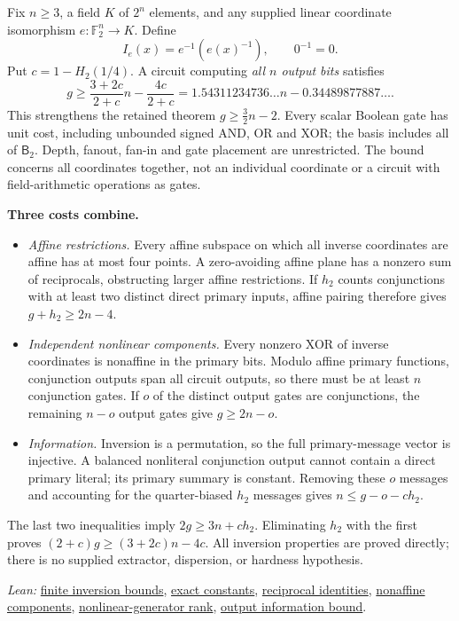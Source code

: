 \documentclass[11pt]{article}
\providecommand{\RepoRoot}{../../}
\newcommand{\repolink}[2]{\href{\RepoRoot#1}{#2}}
\newcommand{\leanlink}[2]{\repolink{Complexitylib/Algebraic/LowerBound/Cutwidth/#1}{#2}}
\newcommand{\Btwo}{\mathsf{B}_2}
\begin{document}
Fix $n\geq3$, a field $K$ of $2^n$ elements, and any supplied linear coordinate
isomorphism $e:\mathbb F_2^n\longrightarrow K$. Define
\[
 I_e(x)=e^{-1}\!\left(e(x)^{-1}\right),\qquad 0^{-1}=0.
\]
Put $c=1-H_2(1/4)$. A circuit computing \emph{all $n$ output bits} satisfies
\[
 \boxed{\quad g\geq\frac{3+2c}{2+c}n-\frac{4c}{2+c}
   =1.54311234736\ldots n-0.34489877887\ldots.\quad}
\]
This strengthens the retained theorem $g\geq\tfrac32n-2$.
Every scalar Boolean gate has unit cost, including unbounded signed AND, OR and
XOR; the basis includes all of $\Btwo$. Depth, fanout, fan-in and gate placement
are unrestricted. The bound concerns all coordinates together, not an individual
coordinate or a circuit with field-arithmetic operations as gates.

\textbf{Three costs combine.}
\begin{itemize}
\item \emph{Affine restrictions.} Every affine subspace on which all inverse
  coordinates are affine has at most four points. A zero-avoiding affine plane
  has a nonzero sum of reciprocals, obstructing larger affine restrictions.
  If $h_2$ counts conjunctions with at least two distinct direct primary inputs,
  affine pairing therefore gives $g+h_2\geq2n-4$.
\item \emph{Independent nonlinear components.} Every nonzero XOR of inverse
  coordinates is nonaffine in the primary bits. Modulo affine primary functions,
  conjunction outputs span all circuit outputs, so there must be at least $n$
  conjunction gates. If $o$ of the distinct output gates are conjunctions, the
  remaining $n-o$ output gates give $g\geq2n-o$.
\item \emph{Information.} Inversion is a permutation, so the full primary-message
  vector is injective. A balanced nonliteral conjunction output cannot contain a
  direct primary literal; its primary summary is constant. Removing these $o$
  messages and accounting for the quarter-biased $h_2$ messages gives
  $n\leq g-o-ch_2$.
\end{itemize}
The last two inequalities imply $2g\geq3n+ch_2$. Eliminating $h_2$ with the first
proves $(2+c)g\geq(3+2c)n-4c$. All inversion properties are proved directly;
there is no supplied extractor, dispersion, or hardness hypothesis.

\textit{Lean:}
\leanlink{Aggregate/Geometry/Inversion.lean}{finite inversion bounds},
\leanlink{Aggregate/Geometry/Inversion/Parameters.lean}{exact constants},
\leanlink{Aggregate/Geometry/Inversion/Field.lean}{reciprocal identities},
\leanlink{Aggregate/Geometry/Inversion/Components.lean}{nonaffine components},
\leanlink{Aggregate/Geometry/Multioutput/Rank.lean}{nonlinear-generator rank},
\leanlink{Aggregate/Geometry/Multioutput/Entropy.lean}{output information bound}.
\end{document}

